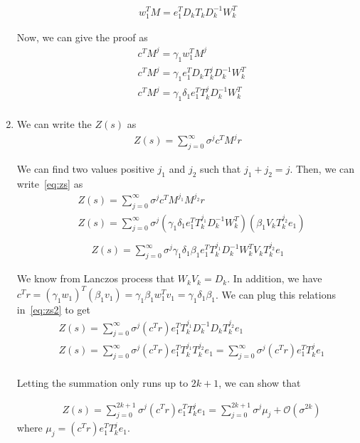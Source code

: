 \begin{enumerate}
\begin{align*}
w_{1}^{T}M = e_{1}^{T} D_{k}T_{k}D^{-1}_{k} W_{k}^{T}
\end{align*}

Now, we can give the proof as 
\begin{align*}
&c^{T}M^{j} = \gamma_{1}w_{1}^{T}M^{j} \\
&c^{T}M^{j} = \gamma_{1}e_{1}^{T} D_{k}T_{k}^{j}D^{-1}_{k} W_{k}^{T} \\
&c^{T}M^{j} = \gamma_{1}\delta_{1}e_{1}^{T}T_{k}^{j}D^{-1}_{k} W_{k}^{T} \\
\end{align*}

\item We can write the $Z(s)$ as 
\begin{align}
Z(s) = \sum_{j=0}^{\infty} \sigma^{j}c^{T}M^{j}r
\label{eq:zs}
\end{align}


We can find two values positive $j_{1}$ and $j_{2}$ such that $j_{1}+j_{2} = j$. Then, we can write~\ref{eq:zs} as 
\begin{align*}
&Z(s) = \sum_{j=0}^{\infty} \sigma^{j}c^{T}M^{j_{1}}M^{j_{2}}r\\
&Z(s) = \sum_{j=0}^{\infty} \sigma^{j} (\gamma_{1}\delta_{1}e_{1}^{T}T_{k}^{j_{1}}D^{-1}_{k} W_{k}^{T})(\beta_{1}V_{k}T_{k}^{j_{2}}e_{1})\\
\end{align*}
\begin{align}
Z(s) = \sum_{j=0}^{\infty} \sigma^{j} \gamma_{1}\delta_{1}\beta_{1}e_{1}^{T}T_{k}^{j_{1}}D_{k}^{-1}W_{k}^{T}V_{k}T_{k}^{j_{2}}e_{1}
\label{eq:zs2}
\end{align}

We know from Lanczos process that $W_{k}V_{k} = D_{k}$. In addition, we have $c^{T}r = (\gamma_{1}w_{1})^{T}(\beta_{1}v_{1}) = \gamma_{1}\beta_{1}w_{1}^{T}v_{1}=\gamma_{1}\delta_{1}\beta_{1}$. We can plug this relations in~\ref{eq:zs2} to get
\begin{align*}
&Z(s) = \sum_{j=0}^{\infty} \sigma^{j} (c^{T}r)e_{1}^{T}T_{k}^{j_{1}}D_{k}^{-1}D_{k}T_{k}^{j_{2}}e_{1}\\
&Z(s) = \sum_{j=0}^{\infty} \sigma^{j} (c^{T}r)e_{1}^{T}T_{k}^{j_{1}}T_{k}^{j_{2}}e_{1} = \sum_{j=0}^{\infty} \sigma^{j} (c^{T}r)e_{1}^{T}T_{k}^{j}e_{1}\\
\end{align*}

Letting the summation only runs up to $2k+1$, we can show that

\begin{align*}
& Z(s) = \sum_{j=0}^{2k+1} \sigma^{j} (c^{T}r)e_{1}^{T}T_{k}^{j}e_{1} =\sum_{j=0}^{2k+1} \sigma^{j} \mu_{j} + \mathcal{O}(\sigma^{2k})
\end{align*}
where $\mu_{j} = (c^{T}r)e_{1}^{T}T_{k}^{j}e_{1}$.
\end{enumerate}